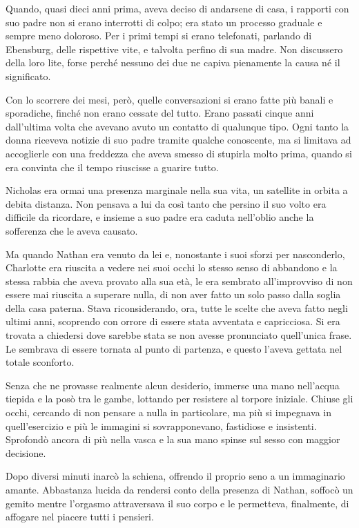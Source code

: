 \documentclass[a4paper,oneside,11pt]{memoir}
\begin{document}
Quando, quasi dieci anni prima, aveva deciso di andarsene di casa, i rapporti con suo padre non si erano interrotti di
colpo; era stato un processo graduale e sempre meno doloroso. Per i primi tempi si erano telefonati, parlando di
Ebensburg, delle rispettive vite, e talvolta perfino di sua madre. Non discussero della loro lite, forse perché nessuno
dei due ne capiva pienamente la causa né il significato.

Con lo scorrere dei mesi, però, quelle conversazioni si erano fatte più banali e sporadiche, finché non erano cessate
del tutto. Erano passati cinque anni dall'ultima volta che avevano avuto un contatto di qualunque tipo. Ogni tanto la
donna riceveva notizie di suo padre tramite qualche conoscente, ma si limitava ad accoglierle con una freddezza che
aveva smesso di stupirla molto prima, quando si era convinta che il tempo riuscisse a guarire tutto.

Nicholas era ormai una presenza marginale nella sua vita, un satellite in orbita a debita distanza. Non pensava a lui da
così tanto che persino il suo volto era difficile da ricordare, e insieme a suo padre era caduta nell'oblio anche la
sofferenza che le aveva causato.

Ma quando Nathan era venuto da lei e, nonostante i suoi sforzi per nasconderlo, Charlotte era riuscita a vedere nei suoi
occhi lo stesso senso di abbandono e la stessa rabbia che aveva provato alla sua età, le era sembrato all'improvviso di
non essere mai riuscita a superare nulla, di non aver fatto un solo passo dalla soglia della casa paterna. Stava
riconsiderando, ora, tutte le scelte che aveva fatto negli ultimi anni, scoprendo con orrore di essere stata avventata e
capricciosa. Si era trovata a chiedersi dove sarebbe stata se non avesse pronunciato quell'unica frase. Le sembrava di
essere tornata al punto di partenza, e questo l'aveva gettata nel totale sconforto.

Senza che ne provasse realmente alcun desiderio, immerse una mano nell'acqua tiepida e la posò tra le gambe, lottando
per resistere al torpore iniziale. Chiuse gli occhi, cercando di non pensare a nulla in particolare, ma più si
impegnava in quell'esercizio e più le immagini si sovrapponevano, fastidiose e insistenti. Sprofondò ancora di più
nella vasca e la sua mano spinse sul sesso con maggior decisione.

Dopo diversi minuti inarcò la schiena, offrendo il proprio seno a un immaginario amante. Abbastanza lucida da rendersi
conto della presenza di Nathan, soffocò un gemito mentre l'orgasmo attraversava il suo corpo e le permetteva,
finalmente, di affogare nel piacere tutti i pensieri.
\end{document}
